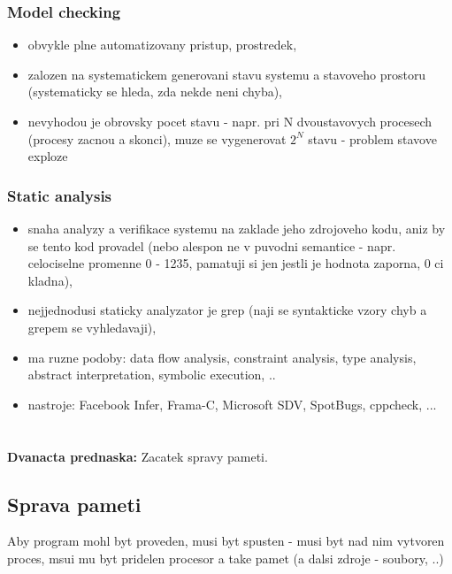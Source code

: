 \documentclass[a4paper, 11pt]{article}
\begin{document}
\subsubsection{Model checking}
\begin{itemize}
    \item obvykle plne automatizovany pristup, prostredek,
    \item zalozen na systematickem generovani stavu systemu a stavoveho prostoru (systematicky se hleda, zda nekde neni chyba),
    \item nevyhodou je obrovsky pocet stavu - napr. pri N dvoustavovych procesech (procesy zacnou a skonci), muze se vygenerovat $2^N$ stavu - problem stavove exploze \\
\end{itemize}

\subsubsection{Static analysis}
\begin{itemize}
    \item snaha analyzy a verifikace systemu na zaklade jeho zdrojoveho kodu, aniz by se tento kod provadel (nebo alespon ne v puvodni semantice - napr. celociselne promenne 0 - 1235, pamatuji si jen jestli je hodnota zaporna, 0 ci kladna),
    \item nejjednodusi staticky analyzator je grep (naji se syntakticke vzory chyb a grepem se vyhledavaji),
    \item ma ruzne podoby: data flow analysis, constraint analysis, type analysis, abstract interpretation, symbolic execution, ..
    \item nastroje: Facebook Infer, Frama-C, Microsoft SDV, SpotBugs, cppcheck, ... \\
\end{itemize}

\newpage

\section{}
\textbf{Dvanacta prednaska:} Zacatek spravy pameti.
\subsection{Sprava pameti}
Aby program mohl byt proveden, musi byt spusten - musi byt nad nim vytvoren proces, msui mu byt pridelen procesor a take pamet (a dalsi zdroje - soubory, ..) \\
\end{document}

